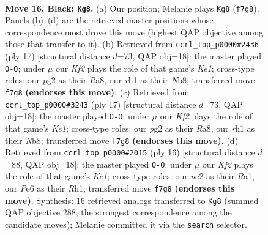 \documentclass[11pt]{article}
\begin{document}
\clearpage

\begin{figure}[p]\centering
\begin{subfigure}{0.46\textwidth}\centering
\resizebox{\linewidth}{!}{%
\newchessgame
\chessboard[
  setfen={rnbqr3/2pn1kpp/pp2p3/3pPp2/3P1P1P/6Q1/PPP1N1P1/1R1K1BNR b - - 7 16},
  showmover=false,
  pgfstyle=straightmove, color=movearrow, markmove={f7-g8}
]}
\caption{}
\end{subfigure}\hfill
\begin{subfigure}{0.46\textwidth}\centering
\resizebox{\linewidth}{!}{%
\newchessgame
\chessboard[
  setfen={rnb1k2r/1p1nqppp/p3p3/2ppP3/3P1P2/5N2/PPP1N1PP/R2QKB1R b KQkq - 1 9},
  showmover=false,
  pgfstyle=straightmove, color=movearrow, markmove={e8-g8}
]}
\caption{}
\end{subfigure}
\\[4pt]
\begin{subfigure}{0.46\textwidth}\centering
\resizebox{\linewidth}{!}{%
\newchessgame
\chessboard[
  setfen={rnb1k2r/1p1nqppp/p3p3/2ppP3/3P1P2/5N2/PPP1N1PP/R2QKB1R b KQkq - 1 9},
  showmover=false,
  pgfstyle=straightmove, color=movearrow, markmove={e8-g8}
]}
\caption{}
\end{subfigure}\hfill
\begin{subfigure}{0.46\textwidth}\centering
\resizebox{\linewidth}{!}{%
\newchessgame
\chessboard[
  setfen={rn1qk2r/pb1p1ppp/1p2pn2/2p5/2PP4/5NP1/PPQ1PPBP/RN2K2R w KQkq - 2 9},
  showmover=false,
  pgfstyle=straightmove, color=movearrow, markmove={e1-g1}
]}
\caption{}
\end{subfigure}
\caption{\textbf{Move 16, Black: \texttt{Kg8}.} (a) Our position; Melanie plays \texttt{Kg8} (\texttt{f7g8}). Panels (b)--(d) are the retrieved master positions whose correspondence most drove this move (highest QAP objective among those that transfer to it). (b) Retrieved from \texttt{ccrl\_top\_p0000\#2436} (ply 17) [structural distance $d$=73, QAP obj=18]: the master played \texttt{O-O}; under $\mu$ our \emph{Kf2} plays the role of that game's \emph{Ke1}; cross-type roles: our \emph{p}g2 as their \emph{R}a8, our \emph{r}h1 as their \emph{N}b8; transferred move \texttt{f7g8} \textbf{(endorses this move)}. (c) Retrieved from \texttt{ccrl\_top\_p0000\#3243} (ply 17) [structural distance $d$=73, QAP obj=18]: the master played \texttt{O-O}; under $\mu$ our \emph{Kf2} plays the role of that game's \emph{Ke1}; cross-type roles: our \emph{p}g2 as their \emph{R}a8, our \emph{r}h1 as their \emph{N}b8; transferred move \texttt{f7g8} \textbf{(endorses this move)}. (d) Retrieved from \texttt{ccrl\_top\_p0000\#2015} (ply 16) [structural distance $d$=88, QAP obj=18]: the master played \texttt{O-O}; under $\mu$ our \emph{Kf2} plays the role of that game's \emph{Ke1}; cross-type roles: our \emph{n}e2 as their \emph{R}a1, our \emph{P}e6 as their \emph{R}h1; transferred move \texttt{f7g8} \textbf{(endorses this move)}. Synthesis: 16 retrieved analogs transferred to \texttt{Kg8} (summed QAP objective 288, the strongest correspondence among the candidate moves); Melanie committed it via the \texttt{search} selector.}
\label{fig:thought-m31}
\end{figure}
\end{document}
